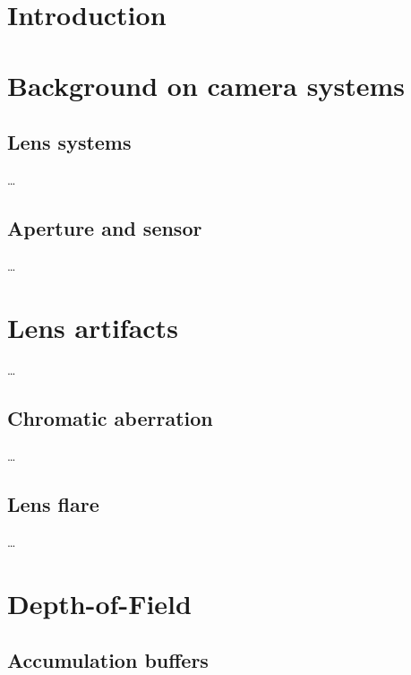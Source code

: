 
\chapter{Introduction}
\label{ch:Introduction}


\chapter{Background on camera systems}
\label{ch:Content1}


\section{Lens systems}

\dots

\section{Aperture and sensor}

\dots


\chapter{Lens artifacts}
\label{ch:Content2}
\dots
\section{Chromatic aberration}
\label{ch:Content2:sec:Section1}

\dots

\section{Lens flare}
\label{ch:Content2:sec:Section2}

\dots

\chapter{Depth-of-Field}

\section{Accumulation buffers}

